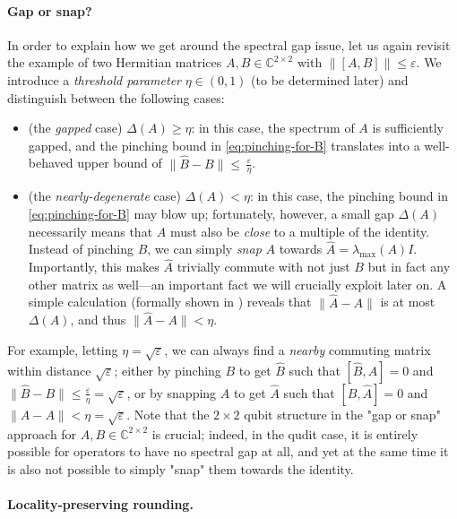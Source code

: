 \documentclass[11pt]{article}
\theoremstyle{plain}
\newcommand{\eps}{\varepsilon}
\begin{document}
\paragraph{Gap or snap?} In order to explain how we get around the spectral gap issue, let us again revisit the example of two Hermitian matrices $A,B \in \mathbb{C}^{2 \times 2}$ with $\|[A,B]\| \leq \eps$. We introduce a \emph{threshold parameter} $\eta \in (0,1)$ (to be determined later) and distinguish between the following cases:
\begin{itemize}
    \item (the \emph{gapped} case) $\Delta(A) \geq \eta$: in this case, the spectrum of $A$ is sufficiently gapped, and the pinching bound in \eqref{eq:pinching-for-B} translates into a well-behaved upper bound of $\|\hat{B} - B\| \leq  \, \frac{\eps}{\eta}$.

    \item (the \emph{nearly-degenerate} case) $\Delta(A) < \eta$: in this case, the pinching bound in \eqref{eq:pinching-for-B} may blow up; fortunately, however, a small gap $\Delta(A)$ necessarily means that $A$ must also be \emph{close} to a multiple of the identity. Instead of pinching $B$, we can simply \emph{snap} $A$ towards $\hat{A} = \lambda_{\max}(A) I$. Importantly, this makes $\hat{A}$ trivially commute with not just $B$ but in fact any other matrix as well---an important fact we will crucially exploit later on.
    A simple calculation (formally shown in ) reveals that $\|\hat{A} - A\|$ is at most $\Delta(A)$, and thus $\|\hat{A} - A\| < \eta$.
\end{itemize}
For example, letting $\eta = \sqrt{\eps}$, we can always find a \emph{nearby} commuting matrix within distance $\sqrt{\eps}$; either by pinching $B$ to get $\hat B$ such that $[\hat{B},A]=0$ and $\|\hat{B} - B\| \leq \frac{\eps}{\eta} = \sqrt{\eps}$, or by snapping $A$ to get $\hat{A}$ such that $[B,\hat{A}]=0$ and $\|\hat{A} - A\| < \eta = \sqrt{\eps}$.
Note that the $2 \times 2$ qubit structure in the "gap or snap" approach for $A,B \in \mathbb{C}^{2 \times 2}$ is crucial; indeed, in the qudit case, it is entirely possible for operators to have no spectral gap at all, and yet at the same time it is also not possible to simply "snap" them towards the identity.


\paragraph{Locality-preserving rounding.} 
\end{document}
